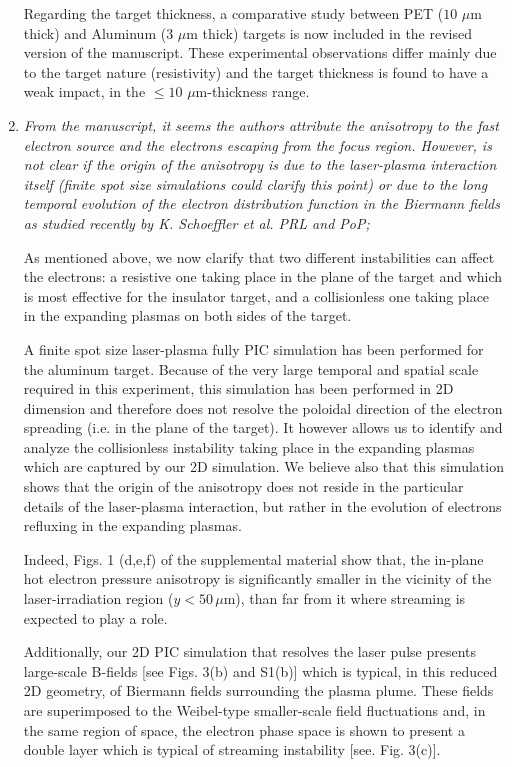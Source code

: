 \documentclass{article}
\begin{document}
\begin{enumerate}
Regarding the target thickness, a comparative study between PET ($10$ $\mu$m thick) and Aluminum  (3 $\mu$m thick)  targets is now included in the revised version of the manuscript. These experimental observations differ mainly due to the target nature (resistivity) and the target thickness is found to have a weak impact, in the $\le 10$  $\mu$m-thickness range.

\item \textit{From the manuscript, it seems the authors attribute the anisotropy to the fast electron source and the electrons escaping from the focus region. However, is not clear if the origin of the anisotropy is due to the laser-plasma interaction itself (finite spot size simulations could clarify this point) or due to the long temporal evolution of the electron distribution function in the Biermann fields as studied recently by K. Schoeffler et al. PRL and PoP;}

As mentioned above, we now clarify that two different instabilities can affect the electrons: a resistive one taking place in the plane of the target and which is most effective for the insulator target, and a collisionless one taking place in the expanding plasmas on both sides of the target.

A finite spot size laser-plasma fully  PIC simulation has been performed for the aluminum target. 
Because of the very large temporal and spatial scale required in this experiment, this simulation has been performed in 2D dimension and therefore does not resolve the poloidal direction of the electron spreading (i.e. in the plane of the target). It however allows us to identify and analyze the collisionless instability taking place in the expanding plasmas which are captured by our  2D simulation.
We believe also that this simulation shows that the origin of the anisotropy does not reside in the particular details of the laser-plasma interaction, but rather in the evolution of electrons refluxing in the expanding plasmas.

Indeed, Figs. 1 (d,e,f) of the supplemental material show that,  the in-plane hot electron pressure anisotropy is significantly smaller
in the vicinity of the laser-irradiation region ($y<50\, \mu$m),  than far from it where streaming is expected to play a role.

Additionally, our 2D PIC simulation that resolves the laser pulse presents large-scale B-fields   [see Figs. 3(b) and S1(b)] which is typical, in this reduced 2D geometry, of Biermann fields surrounding the plasma plume.
These fields are superimposed to the Weibel-type smaller-scale field fluctuations  and, in the same region of space, the electron phase space is shown to present a double layer which is typical of streaming instability [see. Fig. 3(c)].  


\end{enumerate}
\end{document}
